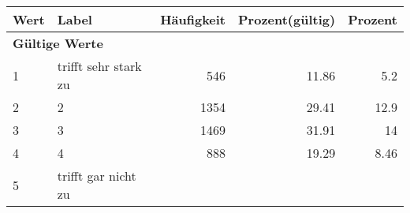      \begin{longtable}{lXrrr}
     \toprule
     \textbf{Wert} & \textbf{Label} & \textbf{Häufigkeit} & \textbf{Prozent(gültig)} & \textbf{Prozent} \\
     \endhead
     \midrule
     \multicolumn{5}{l}{\textbf{Gültige Werte}}\\

     1 &
     \multicolumn{1}{X}{ trifft sehr stark zu   } &


       \num{546} &
       \num[round-mode=places,round-precision=2]{11.86} &
         \num[round-mode=places,round-precision=2]{5.2} \\

     2 &
     \multicolumn{1}{X}{ 2   } &


       \num{1354} &
       \num[round-mode=places,round-precision=2]{29.41} &
         \num[round-mode=places,round-precision=2]{12.9} \\

     3 &
     \multicolumn{1}{X}{ 3   } &


       \num{1469} &
       \num[round-mode=places,round-precision=2]{31.91} &
         \num[round-mode=places,round-precision=2]{14} \\

     4 &
     \multicolumn{1}{X}{ 4   } &


       \num{888} &
       \num[round-mode=places,round-precision=2]{19.29} &
         \num[round-mode=places,round-precision=2]{8.46} \\

     5 &
     \multicolumn{1}{X}{ trifft gar nicht zu   } &



\end{longtable}
